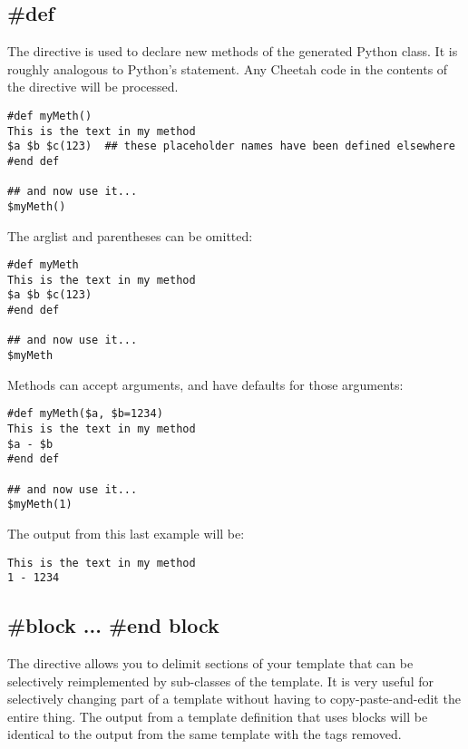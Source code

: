 \subsection{\#def}
\label{inheritanceEtc.def}

The  directive is used to declare new methods of the generated Python
class.  It is roughly analogous to Python's  statement.  Any Cheetah
code in the contents of the  directive will be processed.  

\begin{verbatim}
#def myMeth()
This is the text in my method 
$a $b $c(123)  ## these placeholder names have been defined elsewhere
#end def

## and now use it...
$myMeth()
\end{verbatim}

The arglist and parentheses can be omitted:
\begin{verbatim}
#def myMeth
This is the text in my method 
$a $b $c(123)
#end def

## and now use it...
$myMeth
\end{verbatim}

Methods can accept arguments, and have defaults for those arguments:
\begin{verbatim}
#def myMeth($a, $b=1234)
This is the text in my method 
$a - $b
#end def

## and now use it...
$myMeth(1)
\end{verbatim}

The output from this last example will be:

\begin{verbatim}
This is the text in my method 
1 - 1234
\end{verbatim}

\subsection{\#block ... \#end block}
\label{inheritanceEtc.block}

The  directive allows you to delimit sections of your template
that can be selectively reimplemented by sub-classes of the template.  It is
very useful for selectively changing part of a template without having to
copy-paste-and-edit the entire thing.  The output from a template definition
that uses blocks will be identical to the output from the same template with the 
 tags removed. 


